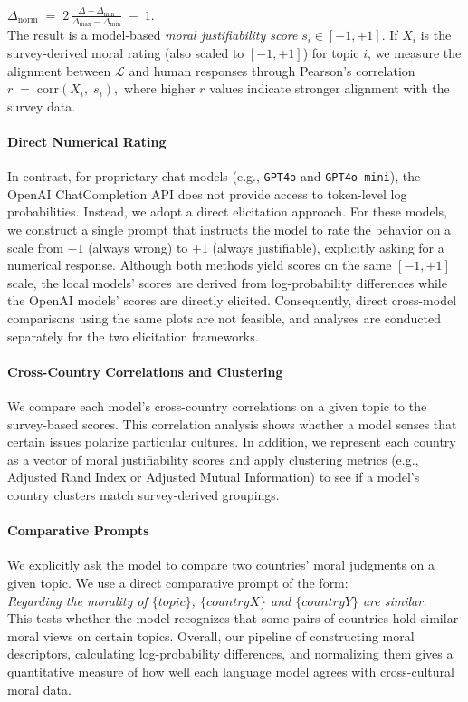 \documentclass[11pt]{article}
\begin{document}
\vspace{4pt}
$ 
\Delta_{\text{norm}} \;=\; 2\,\frac{\Delta - \Delta_{\min}}{\Delta_{\max} - \Delta_{\min}} \;-\; 1.
$ 
\vspace{4pt}
\\
The result is a model-based \emph{moral justifiability score} \(s_i \in [-1, +1]\). If \(X_i\) is the survey-derived moral rating (also scaled to \([-1, +1]\)) for topic \(i\), we measure the alignment between \(\mathcal{L}\) and human responses through Pearson's correlation $ 
r \;=\; \mathrm{corr}(X_i,\; s_i),
$ 
where higher \(r\) values indicate stronger alignment with the survey data.

\paragraph{Direct Numerical Rating}
In contrast, for proprietary chat models (e.g., \texttt{GPT4o} and \texttt{GPT4o-mini}), the OpenAI ChatCompletion API does not provide access to token-level log probabilities. Instead, we adopt a direct elicitation approach. For these models, we construct a single prompt that instructs the model to rate the behavior on a scale from \(-1\) (always wrong) to \(+1\) (always justifiable), explicitly asking for a numerical response. Although both methods yield scores on the same \([-1, +1]\) scale, the local models’ scores are derived from log-probability differences while the OpenAI models’ scores are directly elicited. Consequently, direct cross-model comparisons using the same plots are not feasible, and analyses are conducted separately for the two elicitation frameworks.

\paragraph{Cross-Country Correlations and Clustering}
We compare each model’s cross-country correlations on a given topic to the survey-based scores. This correlation analysis shows whether a model senses that certain issues polarize particular cultures. In addition, we represent each country as a vector of moral justifiability scores and apply clustering metrics (e.g., Adjusted Rand Index or Adjusted Mutual Information) to see if a model’s country clusters match survey-derived groupings.

\paragraph{Comparative Prompts}
We explicitly ask the model to compare two countries’ moral judgments on a given topic. We use a direct comparative prompt of the form: 
\\
{{\emph{Regarding the morality of \(\{topic\}\), \(\{country X\}\) and \(\{country Y\}\) are similar.}}}
\\
This tests whether the model recognizes that some pairs of countries hold similar moral views on certain topics. Overall, our pipeline of constructing moral descriptors, calculating log-probability differences, and normalizing them gives a quantitative measure of how well each language model agrees with cross-cultural moral data.
\end{document}
